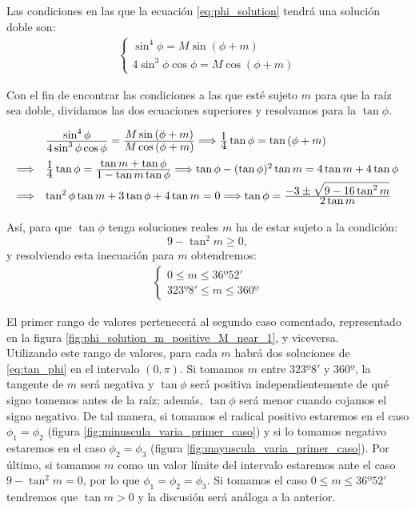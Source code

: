 \documentclass[11pt]{book}
\newcommand\ddfrac[2]{\frac{\displaystyle #1}{\displaystyle #2}}
\begin{document}
Las condiciones en las que la ecuación \eqref{eq:phi_solution} tendrá una solución doble son:
\begin{align}
\left\{
\begin{array}{l}
	\sin^4{\phi}=M\sin{(\phi+m)}\\
	4\sin^3{\phi}\cos{\phi}=M\cos{(\phi+m)}
\end{array}
\right.
\label{eq:condicion_raiz_doble}
\end{align}

Con el fin de encontrar las condiciones a las que esté sujeto $m$ para que la raíz sea doble, dividamos las dos ecuaciones superiores y resolvamos para la $\tan{\phi}$.
\begin{align}
\def\arraystretch{2}
\begin{array}{ll}
  & \ddfrac{\sin^4{\phi}}{4\sin^3{\phi}\cos{\phi}}=\ddfrac{M\sin{(\phi+m)}}{M\cos{(\phi+m)}}\Longrightarrow \ddfrac{1}{4}\tan{\phi}=\tan{(\phi+m)}\\
\Longrightarrow & \ddfrac{1}{4}\tan{\phi}=\ddfrac{\tan{m}+\tan{\phi}}{1-\tan{m}\tan{\phi}} \Longrightarrow \tan{\phi}-(\tan{\phi})^2\tan{m}=4\tan{m}+4\tan{\phi}\\
\Longrightarrow & \tan^2{\phi}\tan{m}+3\tan{\phi}+4\tan{m}=0 \Longrightarrow \tan{\phi}=\ddfrac{-3\pm\sqrt{9-16\tan^2{m}}}{2\tan{m}}
\end{array}
\label{eq:tan_phi}
\end{align}

Así, para que $\tan{\phi}$ tenga soluciones reales $m$ ha de estar sujeto a la condición:
\[
9-\tan^2{m}\geq0,
\]
\noindent y resolviendo esta inecuación para $m$ obtendremos:
\begin{align}
\left\{
\begin{array}{l}
	0 \leq m \leq 36º52'\\
	323º8' \leq m \leq 360º
\end{array}
\right.
\label{eq:m_condition}
\end{align}

El primer rango de valores pertenecerá al segundo caso comentado, representado en la figura \ref{fig:phi_solution_m_positive_M_near_1}, y viceversa.\\

Utilizando este rango de valores, para cada $m$ habrá dos soluciones de \eqref{eq:tan_phi} en el intervalo $(0,\pi)$. Si tomamos $m$ entre $323º8'$ y $360º$, la tangente de $m$ será negativa y $\tan{\phi}$ será positiva independientemente de qué signo tomemos antes de la raíz; además, $\tan{\phi}$ será menor cuando cojamos el signo negativo. De tal manera, si tomamos el radical positivo estaremos en el caso $\phi_1=\phi_2$ (figura \ref{fig:minuscula_varia_primer_caso}) y si lo tomamos negativo estaremos en el caso $\phi_2=\phi_3$ (figura \ref{fig:mayuscula_varia_primer_caso}). Por último, si tomamos $m$ como un valor límite del intervalo estaremos ante el caso $9-\tan^2{m}=0$, por lo que $\phi_1=\phi_2=\phi_3$. Si tomamos el caso $0 \leq m \leq 36º52'$ tendremos que $\tan{m}>0$ y la discusión será análoga a la anterior.\\
\end{document}
